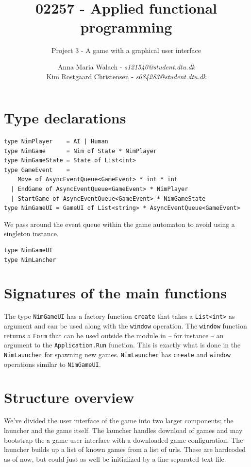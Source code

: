 \documentclass[10pt]{scrartcl}
\title{02257 - Applied functional programming}
\subtitle{Project 3 - A game with a graphical user interface}
\author{Anna Maria Walach - \textit {s121540@student.dtu.dk} \\ Kim Rostgaard Christensen - \textit {s084283@student.dtu.dk}}
\begin{document}
\maketitle
\section{Type declarations}
\begin{lstlisting}
type NimPlayer    = AI | Human
type NimGame      = Nim of State * NimPlayer
type NimGameState = State of List<int>
type GameEvent    =  
    Move of AsyncEventQueue<GameEvent> * int * int 
  | EndGame of AsyncEventQueue<GameEvent> * NimPlayer 
  | StartGame of AsyncEventQueue<GameEvent> * NimGameState
type NimGameUI = GameUI of List<string> * AsyncEventQueue<GameEvent>
\end{lstlisting}
We pass around the event queue within the game automaton to avoid using a singleton instance.

\begin{lstlisting}
type NimGameUI
type NimLancher
\end{lstlisting}

\section{Signatures of the main functions}
The type \texttt{NimGameUI} has a factory function \texttt{create} that takes a \texttt{List<int>} as argument and can be used along with the \texttt{window} operation. The \texttt{window} function returns a \texttt{Form} that can be used outside the module in -- for instance -- an argument to the \texttt{Application.Run} function. This is exactly what is done in the \texttt{NimLauncher} for spawning new games. \texttt{NimLauncher} has \texttt{create} and  \texttt{window} operations similar to \texttt{NimGameUI}.

\section{Structure overview}
We've divided the user interface of the game into two larger components; the launcher and the game itself. The launcher handles download of games and may bootstrap the a game user interface with a downloaded game configuration. The launcher builds up a list of known games from a list of urls. These are hardcoded as of now, but could just as well be initialized by a line-separated text file.
\end{document}
